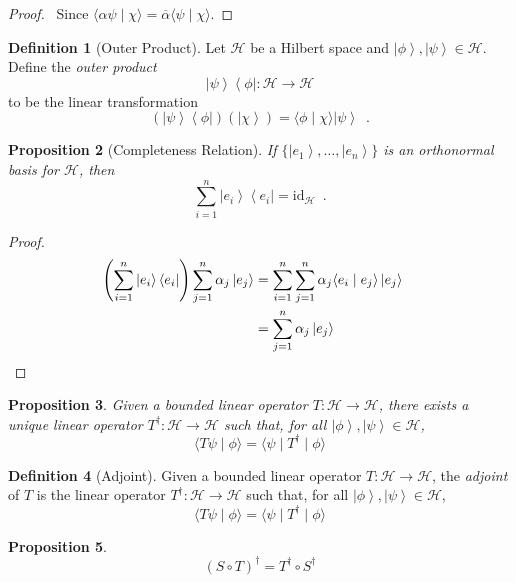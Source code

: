 \documentclass{book}
\let\qed\relax
\newtheorem{prop}{Proposition}[chapter]
\theoremstyle{definition}
\newtheorem{df}[prop]{Definition}
\newcommand{\bra}[1]{\ensuremath{\left\langle {#1} \right|}}
\newcommand{\id}[1]{\ensuremath{\mathrm{id}_{#1}}}
\newcommand{\ket}[1]{\ensuremath{\left| {#1} \right\rangle}}
\begin{document}
\begin{proof}
\pf\ Since $\langle \alpha \psi \mid \chi \rangle = \overline{\alpha} \langle \psi \mid \chi \rangle$. \qed
\end{proof}

\begin{df}[Outer Product]
Let $\mathcal{H}$ be a Hilbert space and $\ket{\phi}, \ket{\psi} \in \mathcal{H}$. Define the \emph{outer product}
\[ \ket{\psi} \bra{\phi} : \mathcal{H} \rightarrow \mathcal{H} \]
to be the linear transformation
\[ (\ket{\psi} \bra{\phi})(\ket{\chi}) = \langle \phi \mid \chi \rangle \ket{\psi} \enspace . \]
\end{df}

\begin{prop}[Completeness Relation]
If $\{ \ket{e_1}, \ldots, \ket{e_n} \}$ is an orthonormal basis for $\mathcal{H}$, then
\[ \sum_{i=1}^n \ket{e_i} \bra{e_i} = \id{\mathcal{H}} \enspace . \]
\end{prop}

\begin{proof}
\pf
\begin{align*}
\left( \sum_{i=1}^n \ket{e_i} \bra{e_i} \right) \sum_{j=1}^n \alpha_j \ket{e_j}
& = \sum_{i=1}^n \sum_{j=1}^n \alpha_j \langle e_i \mid e_j \rangle \ket{e_j} \\
& = \sum_{j=1}^n \alpha_j \ket{e_j} & \qed
\end{align*}
\end{proof}

\begin{prop}
Given a bounded linear operator $T : \mathcal{H} \rightarrow \mathcal{H}$, there exists a unique linear operator $T^\dagger : \mathcal{H} \rightarrow \mathcal{H}$ such that, for all $\ket{\phi}, \ket{\psi} \in \mathcal{H}$,
\[ \langle T \psi \mid \phi \rangle = \langle \psi \mid T^\dagger \mid \phi \rangle \]
\end{prop}


\begin{df}[Adjoint]
Given a bounded linear operator $T : \mathcal{H} \rightarrow \mathcal{H}$, the \emph{adjoint} of $T$ is the linear operator $T^\dagger : \mathcal{H} \rightarrow \mathcal{H}$ such that, for all $\ket{\phi}, \ket{\psi} \in \mathcal{H}$,
\[ \langle T \psi \mid \phi \rangle = \langle \psi \mid T^\dagger \mid \phi \rangle \]
\end{df}

\begin{prop}
\[ (S \circ T)^\dagger = T^\dagger \circ S^\dagger \]
\end{prop}
\end{document}
